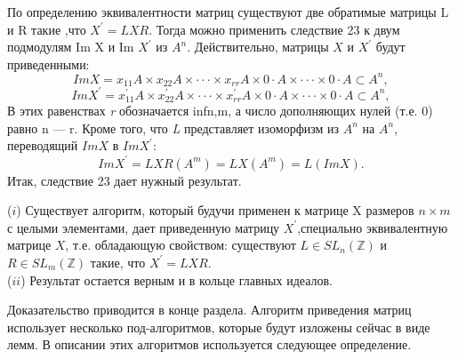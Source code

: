 \begin{myproof}
По определению эквивалентности матриц существуют две обратимые матрицы L и R такие ,что $X^{'} = L X R$. Тогда можно применить следствие 23 к двум подмодулям Im X и Im $X^{'}$ из $A^{n}$. Действительно, матрицы $X$ и $X^{'}$ будут приведенными:
$$ Im X = x_{11} A \times x_{22} A \times \cdot \cdot \cdot \times x_{rr} A \times 0 \cdot A \times \cdot \cdot \cdot \times 0 \cdot A \subset A^{n}, $$
$$ Im X^{'} = x_{11}^{'} A \times x_{22}^{'} A \times \cdot \cdot \cdot \times x_{rr}^{'} A \times 0 \cdot A \times \cdot \cdot \cdot \times 0 \cdot A \subset A^{n}, $$
В этих равенствах \textit{r} обозначается inf{n,m}, а число дополняющих нулей (т.е. 0) равно n — r. Кроме того, что \textit{L} представляет изоморфизм из $A^{n}$ на $A^{n}$, переводящий $Im X$ в $Im X^{'}$:
$$ Im X^{'} = L X R(A^{m}) = L X (A^{m}) = L(Im X). $$
Итак, следствие 23 дает нужный результат.\\
\end{myproof}
\begin{thm}
\hspace*{0.5cm}
($i$) Существует алгоритм, который будучи применен к матрице X размеров $n \times m $ с целыми элементами, дает приведенную матрицу $X^{'}$,специально эквивалентную матрице $X$, т.е. обладающую свойством: существуют $ L \in S L_{n}(\mathbb{Z})$ и $R \in S L_{m}(\mathbb{Z})$ такие, что $X^{'} = L X R$.\\

($ii$) Результат остается верным и в кольце главных идеалов.
\end{thm}
Доказательство приводится в конце раздела. Алгоритм приведения матриц использует несколько под-алгоритмов, которые будут изложены сейчас в виде лемм. В описании этих алгоритмов используется следующее определение.

